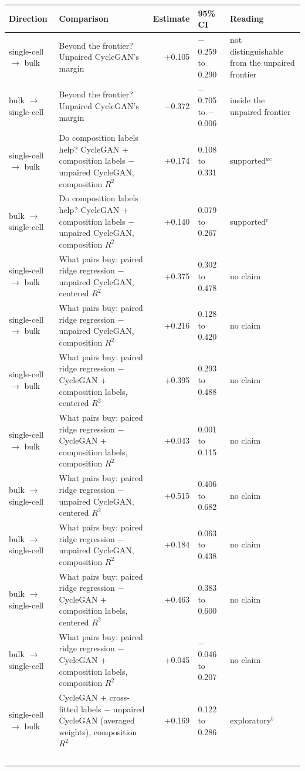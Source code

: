 \begin{table}[t]
\centering
\small
\begin{tabular}{llrll}
\toprule
Direction & Comparison & Estimate & 95\% CI & Reading \\
\midrule
single-cell $\to$ bulk & Beyond the frontier? Unpaired CycleGAN's margin & +0.105 & $-$0.259 to 0.290 & not distinguishable from the unpaired frontier \\
bulk $\to$ single-cell & Beyond the frontier? Unpaired CycleGAN's margin & $-$0.372 & $-$0.705 to $-$0.006 & inside the unpaired frontier \\
single-cell $\to$ bulk & Do composition labels help? CycleGAN + composition labels $-$ unpaired CycleGAN, composition $R^2$ & +0.174 & 0.108 to 0.331 & supported$^{a}$$^{c}$ \\
bulk $\to$ single-cell & Do composition labels help? CycleGAN + composition labels $-$ unpaired CycleGAN, composition $R^2$ & +0.140 & 0.079 to 0.267 & supported$^{c}$ \\
single-cell $\to$ bulk & What pairs buy: paired ridge regression $-$ unpaired CycleGAN, centered $R^2$ & +0.375 & 0.302 to 0.478 & no claim \\
single-cell $\to$ bulk & What pairs buy: paired ridge regression $-$ unpaired CycleGAN, composition $R^2$ & +0.216 & 0.128 to 0.420 & no claim \\
single-cell $\to$ bulk & What pairs buy: paired ridge regression $-$ CycleGAN + composition labels, centered $R^2$ & +0.395 & 0.293 to 0.488 & no claim \\
single-cell $\to$ bulk & What pairs buy: paired ridge regression $-$ CycleGAN + composition labels, composition $R^2$ & +0.043 & 0.001 to 0.115 & no claim \\
bulk $\to$ single-cell & What pairs buy: paired ridge regression $-$ unpaired CycleGAN, centered $R^2$ & +0.515 & 0.406 to 0.682 & no claim \\
bulk $\to$ single-cell & What pairs buy: paired ridge regression $-$ unpaired CycleGAN, composition $R^2$ & +0.184 & 0.063 to 0.438 & no claim \\
bulk $\to$ single-cell & What pairs buy: paired ridge regression $-$ CycleGAN + composition labels, centered $R^2$ & +0.463 & 0.383 to 0.600 & no claim \\
bulk $\to$ single-cell & What pairs buy: paired ridge regression $-$ CycleGAN + composition labels, composition $R^2$ & +0.045 & $-$0.046 to 0.207 & no claim \\
single-cell $\to$ bulk & CycleGAN + cross-fitted labels $-$ unpaired CycleGAN (averaged weights), composition $R^2$ & +0.169 & 0.122 to 0.286 & exploratory$^{b}$ \\
$$
\end{tabular}
\end{table}
